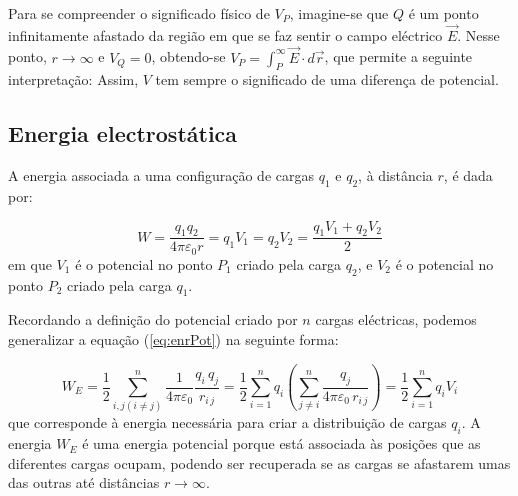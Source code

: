 \documentclass[a4paper,twoside,12pt]{article}      %
\begin{document}
Para se compreender o significado físico de $V_P$, imagine-se que $Q$ é um ponto infinitamente
afastado da região em que se faz sentir o campo eléctrico $\vec{E}$.
Nesse ponto, $r \to \infty $ e $V_Q=0$,
obtendo-se $V_P =  \int_P^\infty  \vec{E} \cdot d\vec{r}$, que permite a seguinte interpretação:
\newline
\newline
{}
\newline
\newline
Assim, $V$ tem sempre o significado de uma diferença de potencial.

\subsection{{\sf Energia electrostática}}
A energia associada a uma configuração de cargas $q_1$ e $q_2$, à distância $r$, é dada por:

\begin{equation}\label{eq:enrPot}
 W = \frac{q_1 q_2}{4 \pi \varepsilon_0 r} = q_1 V_1 = q_2 V_2 =  \frac{q_1 V_1 +q_2 V_2}{2} 
\end{equation}
em que $V_1$ é o potencial no ponto $P_1$ criado pela carga $q_2$, e $V_2$ é o potencial no ponto $P_2$ criado pela carga $q_1$. 

Recordando a definição do potencial criado por $n$ cargas eléctricas, podemos generalizar a equação (\ref{eq:enrPot}) na seguinte forma:

\begin{equation}%
 W_E =  \frac{1}{2} \sum_{i,j (i\ne j)}^n \frac{ 1 }{4 \pi \varepsilon_0} \frac{ q_i \, q_j }{r_{i\,j}}  = 
	 \frac{1}{2} \sum_{i=1}^n q_i \left( \sum_{j \ne i}^n \frac{ q_j }{4 \pi \varepsilon_0 \,r_{i\,j}} \right) =
	\frac{1}{2} \sum_{i=1}^n q_i V_i
\end{equation}
que corresponde à energia necessária para criar a distribuição de cargas $q_i$. A energia $W_E$ é uma energia potencial porque está associada às posições que as diferentes cargas ocupam, podendo ser recuperada se as cargas se afastarem umas das outras até distâncias $r \to \infty$.
\end{document}
